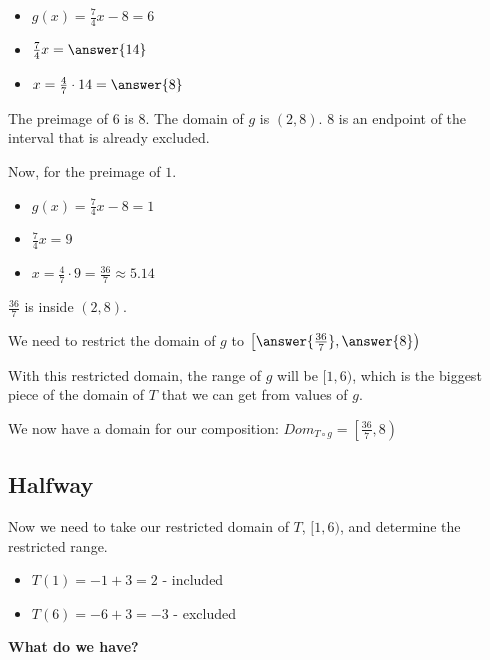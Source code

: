\documentclass{ximera}
\begin{document}
\begin{itemize}
\item $g(x) = \frac{7}{4}x-8 = 6$
\item $\frac{7}{4}x = \answer{14}$
\item $x = \frac{4}{7} \cdot 14 = \answer{8}$
\end{itemize}


The preimage of $6$ is $8$.  The domain of $g$ is $(2,8)$. $8$ is an endpoint of the interval that is already excluded.


Now, for the preimage of $1$.

\begin{itemize}
\item $g(x) = \frac{7}{4}x-8 = 1$
\item $\frac{7}{4}x = 9$
\item $x = \frac{4}{7} \cdot 9 = \frac{36}{7} \approx 5.14$
\end{itemize}

$\frac{36}{7}$ is inside $(2,8)$.

We need to restrict the domain of $g$ to $\left[ \answer{\frac{36}{7}}, \answer{8} \right)$


With this restricted domain, the range of $g$ will be $[1, 6)$, which is the biggest piece of the domain of $T$ that we can get from values of $g$.

We now have a domain for our composition: $Dom_{T \circ g} = \left[\frac{36}{7}, 8\right)$



\subsection{Halfway}



Now we need to take our restricted domain of $T$, $[1, 6)$, and determine the restricted range.



\begin{itemize}
\item $T(1) = -1+3 = 2$ - included\\
\item $T(6) = -6+3 = -3$ - excluded \\
\end{itemize}







\textbf{What do we have?}
\end{document}
